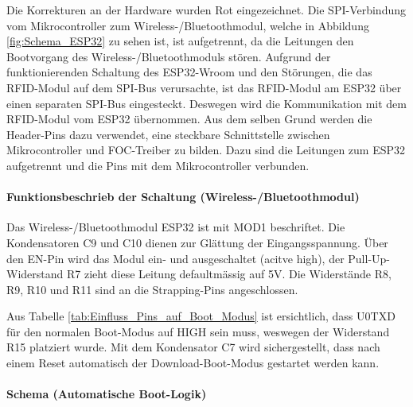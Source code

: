 Die Korrekturen an der Hardware wurden Rot eingezeichnet. Die SPI-Verbindung vom Mikrocontroller zum Wireless-/Bluetoothmodul, welche in Abbildung \ref{fig:Schema_ESP32} zu sehen ist, ist aufgetrennt, da die Leitungen den Bootvorgang des Wireless-/Bluetoothmoduls stören. Aufgrund der funktionierenden Schaltung des ESP32-Wroom und den Störungen, die das RFID-Modul auf dem SPI-Bus verursachte, ist das RFID-Modul am ESP32 über einen separaten SPI-Bus eingesteckt. Deswegen wird die Kommunikation mit dem RFID-Modul vom ESP32 übernommen. Aus dem selben Grund werden die Header-Pins dazu verwendet, eine steckbare Schnittstelle zwischen Mikrocontroller und FOC-Treiber zu bilden. Dazu sind die Leitungen zum ESP32 aufgetrennt und die Pins mit dem Mikrocontroller verbunden.

\paragraph{Funktionsbeschrieb der Schaltung (Wireless-/Bluetoothmodul)}\mbox{}

Das Wireless-/Bluetoothmodul ESP32 ist mit MOD1 beschriftet. Die Kondensatoren C9 und C10 dienen zur Glättung der Eingangsspannung. Über den EN-Pin wird das Modul ein- und ausgeschaltet (acitve high), der Pull-Up-Widerstand R7 zieht diese Leitung defaultmässig auf 5V. Die Widerstände R8, R9, R10 und R11 sind an die Strapping-Pins angeschlossen.

Aus Tabelle \ref{tab:Einfluss_Pins_auf_Boot_Modus} ist ersichtlich, dass U0TXD für den normalen Boot-Modus auf HIGH sein muss, weswegen der Widerstand R15 platziert wurde. Mit dem Kondensator C7 wird sichergestellt, dass nach einem Reset automatisch der Download-Boot-Modus gestartet werden kann.


\paragraph{Schema (Automatische Boot-Logik)}\mbox{}

